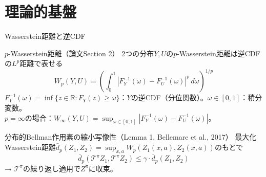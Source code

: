 \documentclass[aspectratio=169, dvipdfmx, 11pt]{beamer}
\begin{document}
\section{理論的基盤}

\begin{frame}{Wasserstein距離と逆CDF}
  \begin{block}{$p$-Wasserstein距離（論文Section 2）}
    {\small 2つの分布$Y, U$の$p$-Wasserstein距離は逆CDFの$L^p$距離で表せる}
    {\small
    \[
      W_p(Y, U) = \left(\int_0^1 \left|F_Y^{-1}(\omega) - F_U^{-1}(\omega)\right|^p \, d\omega \right)^{1/p}
    \]
    }
    {\scriptsize $F_Y^{-1}(\omega) = \inf\{z \in \mathbb{R} : F_Y(z) \geq \omega\}$：$Y$の逆CDF（分位関数）。$\omega \in [0,1]$：積分変数。}\\
    {\scriptsize $p = \infty$の場合：$W_\infty(Y, U) = \sup_{\omega \in [0,1]} |F_Y^{-1}(\omega) - F_U^{-1}(\omega)|$。}
  \end{block}
  \vfill
  \begin{exampleblock}{分布的Bellman作用素の縮小写像性（Lemma 1, Bellemare et al., 2017）}
    {\small 最大化Wasserstein距離$\bar{d}_p(Z_1, Z_2) = \sup_{x,a} W_p(Z_1(x,a), Z_2(x,a))$のもとで}
    {\small
    \[
      \bar{d}_p(\mathcal{T}^\pi Z_1, \mathcal{T}^\pi Z_2) \leq \gamma \cdot \bar{d}_p(Z_1, Z_2)
    \]
    }
    {\scriptsize → $\mathcal{T}^\pi$の繰り返し適用で$Z^\pi$に収束。}
  \end{exampleblock}
\end{frame}
\end{document}
